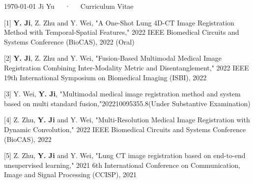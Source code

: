 \documentclass[11pt, a4paper]{awesome-cv}
\begin{document}
\makecvheader

\makecvfooter
  {\today}
  {Ji Yu~~~·~~~Curriculum Vitae}
  {\thepage}





% 

% 
% 
% 


[1] \textbf{Y. Ji}, Z. Zhu and Y. Wei, "A One-Shot Lung 4D-CT Image Registration Method with Temporal-Spatial Features," 2022 IEEE Biomedical Circuits and Systems Conference (BioCAS), 2022 (Oral)

[2] \textbf{Y. Ji}, Z. Zhu and Y. Wei, "Fusion-Based Multimodal Medical Image Registration Combining Inter-Modality Metric and Disentanglement," 2022 IEEE 19th International Symposium on Biomedical Imaging (ISBI), 2022

[3] Y. Wei, \textbf{Y. Ji}, "Multimodal medical image registration method and system based on multi standard fusion,"202210095355.8(Under Substantive Examination)

[4] Z. Zhu, \textbf{Y. Ji} and Y. Wei, "Multi-Resolution Medical Image Registration with Dynamic Convolution," 2022 IEEE Biomedical Circuits and Systems Conference (BioCAS), 2022

[5] Z. Zhu, \textbf{Y. Ji} and Y. Wei, "Lung CT image registration based on end-to-end unsupervised learning," 2021 6th International Conference on Communication, Image and Signal Processing (CCISP), 2021
\end{document}
